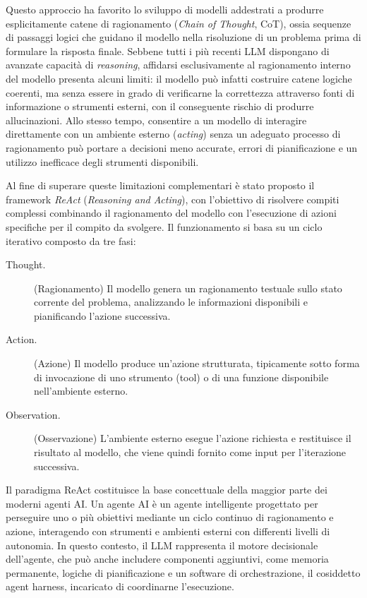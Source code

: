 Questo approccio ha favorito lo sviluppo di modelli addestrati a produrre esplicitamente catene di ragionamento (\textit{Chain of Thought}, CoT), ossia sequenze di passaggi logici che guidano il modello nella risoluzione di un problema prima di formulare la risposta finale. Sebbene tutti i più recenti LLM dispongano di avanzate capacità di \textit{reasoning}, affidarsi esclusivamente al ragionamento interno del modello presenta alcuni limiti: il modello può infatti costruire catene logiche coerenti, ma senza essere in grado di verificarne la correttezza attraverso fonti di informazione o strumenti esterni, con il conseguente rischio di produrre allucinazioni. Allo stesso tempo, consentire a un modello di interagire direttamente con un ambiente esterno (\textit{acting}) senza un adeguato processo di ragionamento può portare a decisioni meno accurate, errori di pianificazione e un utilizzo inefficace degli strumenti disponibili.

Al fine di superare queste limitazioni complementari è stato proposto il framework \textit{ReAct} (\textit{Reasoning and Acting}), con l'obiettivo di risolvere compiti complessi combinando il ragionamento del modello con l'esecuzione di azioni specifiche per il compito da svolgere. Il funzionamento si basa su un ciclo iterativo composto da tre fasi:

\begin{description}
    \item[Thought.] (Ragionamento) Il modello genera un ragionamento testuale sullo stato corrente del problema, analizzando le informazioni disponibili e pianificando l'azione successiva.
    \item[Action.] (Azione) Il modello produce un'azione strutturata, tipicamente sotto forma di invocazione di uno strumento (tool) o di una funzione disponibile nell'ambiente esterno.
    \item[Observation.] (Osservazione) L'ambiente esterno esegue l'azione richiesta e restituisce il risultato al modello, che viene quindi fornito come input per l'iterazione successiva.
\end{description}

\cite{yao2023react}

Il paradigma ReAct costituisce la base concettuale della maggior parte dei moderni agenti AI. Un agente AI è un agente intelligente progettato per perseguire uno o più obiettivi mediante un ciclo continuo di ragionamento e azione, interagendo con strumenti e ambienti esterni con differenti livelli di autonomia. In questo contesto, il LLM rappresenta il motore decisionale dell'agente, che può anche includere componenti aggiuntivi, come memoria permanente, logiche di pianificazione e un software di orchestrazione, il cosiddetto agent harness, incaricato di coordinarne l'esecuzione.

